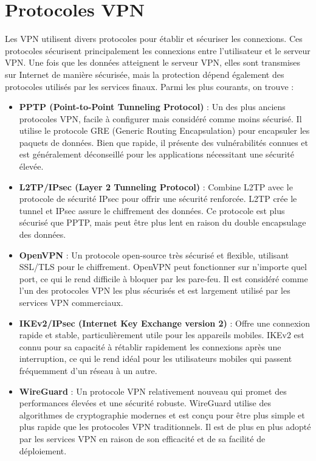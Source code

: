 \documentclass{report}
\begin{document}
\section{Protocoles VPN}
Les VPN utilisent divers protocoles pour établir et sécuriser les connexions. Ces protocoles sécurisent principalement les connexions entre l'utilisateur et le serveur VPN. Une fois que les données atteignent le serveur VPN, elles sont transmises sur Internet de manière sécurisée, mais la protection dépend également des protocoles utilisés par les services finaux. Parmi les plus courants, on trouve :

\begin{itemize}
  \item \textbf{PPTP (Point-to-Point Tunneling Protocol)} : Un des plus anciens protocoles VPN, facile à configurer mais considéré comme moins sécurisé. Il utilise le protocole GRE (Generic Routing Encapsulation) pour encapsuler les paquets de données. Bien que rapide, il présente des vulnérabilités connues et est généralement déconseillé pour les applications nécessitant une sécurité élevée.
  \item \textbf{L2TP/IPsec (Layer 2 Tunneling Protocol)} : Combine L2TP avec le protocole de sécurité IPsec pour offrir une sécurité renforcée. L2TP crée le tunnel et IPsec assure le chiffrement des données. Ce protocole est plus sécurisé que PPTP, mais peut être plus lent en raison du double encapsulage des données.
  \item \textbf{OpenVPN} : Un protocole open-source très sécurisé et flexible, utilisant SSL/TLS pour le chiffrement. OpenVPN peut fonctionner sur n'importe quel port, ce qui le rend difficile à bloquer par les pare-feu. Il est considéré comme l'un des protocoles VPN les plus sécurisés et est largement utilisé par les services VPN commerciaux.
  \item \textbf{IKEv2/IPsec (Internet Key Exchange version 2)} : Offre une connexion rapide et stable, particulièrement utile pour les appareils mobiles. IKEv2 est connu pour sa capacité à rétablir rapidement les connexions après une interruption, ce qui le rend idéal pour les utilisateurs mobiles qui passent fréquemment d'un réseau à un autre.
  \item \textbf{WireGuard} : Un protocole VPN relativement nouveau qui promet des performances élevées et une sécurité robuste. WireGuard utilise des algorithmes de cryptographie modernes et est conçu pour être plus simple et plus rapide que les protocoles VPN traditionnels. Il est de plus en plus adopté par les services VPN en raison de son efficacité et de sa facilité de déploiement.
\end{itemize}
\end{document}
